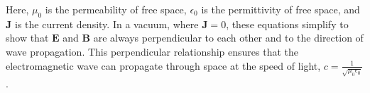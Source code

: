 Here, \(\mu_0\) is the permeability of free space, \(\epsilon_0\) is the permittivity of free space, and \(\mathbf{J}\) is the current density. In a vacuum, where \(\mathbf{J} = 0\), these equations simplify to show that \(\mathbf{E}\) and \(\mathbf{B}\) are always perpendicular to each other and to the direction of wave propagation. This perpendicular relationship ensures that the electromagnetic wave can propagate through space at the speed of light, \(c = \frac{1}{\sqrt{\mu_0 \epsilon_0}}\).

